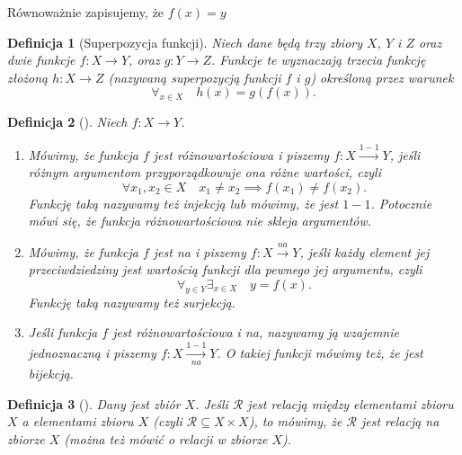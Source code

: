 \documentclass[12pt,a4paper]{report}
\newtheorem{definition}{Definicja}[chapter]
\begin{document}
Równoważnie zapisujemy, że $f(x)=y$

\begin{definition}[Superpozycja funkcji{\citep[Sec 4.2]{kuratowski1966wstkep}}]
Niech dane będą trzy zbiory $X$, $Y$ i $Z$ oraz dwie funkcje $f:X\to Y$, oraz $g:Y\to Z$. Funkcje te wyznaczają trzecia funkcję złożoną $h:X\to Z$ (nazywaną superpozycją funkcji $f$ i $g$) określoną przez warunek
\begin{equation*}
\forall_{x \in X} \quad h(x)=g(f(x)).
\end{equation*}
\end{definition}

\begin{definition}[{\citep[Sec 5.2]{kraszewski2007wstkep}}]
Niech $f:X \to Y$.
\begin{enumerate}
\item
Mówimy, że funkcja $f$ jest różnowartościowa i piszemy $f:X\xrightarrow{1-1} Y$, jeśli różnym argumentom przyporządkowuje ona różne wartości, czyli
\begin{equation*}
\forall{x_{1},x_{2}}\in X \quad x_{1}\ne x_{2} \implies f(x_{1})\ne f(x_{2}).
\end{equation*}
Funkcję taką nazywamy też injekcją lub mówimy, że jest $1-1$. Potocznie mówi się, że funkcja różnowartościowa nie skleja argumentów.
\item
Mówimy, że funkcja $f$ jest na i piszemy $f:X\xrightarrow{na}Y$, jeśli każdy element jej przeciwdziedziny jest wartością funkcji dla pewnego jej argumentu, czyli
\begin{equation*}
\forall_{y\in Y} \exists_{x\in X} \quad y=f(x).
\end{equation*}
Funkcję taką nazywamy też surjekcją.
\item
Jeśli funkcja $f$ jest różnowartościowa i na, nazywamy ją wzajemnie jednoznaczną i piszemy $f:X\xrightarrow[na]{1-1} Y$. O takiej funkcji mówimy też, że jest bijekcją.
\end{enumerate}
\end{definition}

\begin{definition}[{\citep[Sec 6.1]{kraszewski2007wstkep}}]
Dany jest zbiór $X$. Jeśli $\mathcal{R}$ jest relacją między elementami zbioru $X$ a elementami zbioru $X$ (czyli $\mathcal{R}\subseteq X \times X$), to mówimy, że $\mathcal{R}$ jest relacją na zbiorze $X$ (można też mówić o relacji w zbiorze $X$).
\end{definition}
\end{document}
